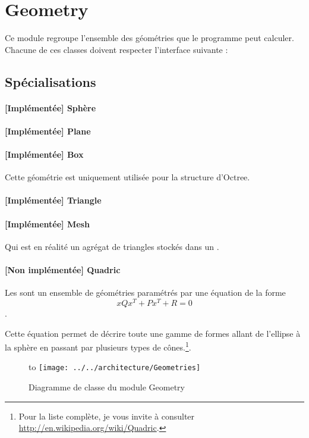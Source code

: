 \section{Geometry}
Ce module regroupe l'ensemble des géométries que le programme peut calculer.
Chacune de ces classes doivent respecter l'interface suivante :


\subsection{Spécialisations}
\paragraph{[Implémentée] Sphère}
\paragraph{[Implémentée] Plane}
\paragraph{[Implémentée] Box} Cette géométrie est uniquement utilisée pour la
structure d'Octree.

\paragraph{[Implémentée] Triangle}

\paragraph{[Implémentée] Mesh} Qui est en réalité un agrégat de triangles
stockés dans un .

\paragraph{[Non implémentée] Quadric} Les  sont un ensemble de
géométries paramétrés par une équation de la forme $$xQx^T + Px^T + R = 0$$. 

Cette équation permet de décrire toute une gamme de formes allant de l'ellipse
à la sphère en passant par plusieurs types de cônes.\footnote{Pour la liste
complète, je vous invite à consulter
\url{http://en.wikipedia.org/wiki/Quadric}.}.

\begin{figure}[h]
  \hbox to \textwidth
  {\hss\texttt{[image: ../../architecture/Geometries]}\hss}
  \caption{Diagramme de classe du module Geometry\label{fig:CDGeometry}}
\end{figure}
